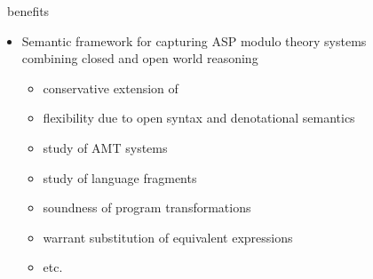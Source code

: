 \begin{frame}{\HTC\ benefits}
  \bigskip
  \begin{itemize}
  \item Semantic framework for capturing ASP modulo theory systems
    \\
    combining closed and open world reasoning
    \par\smallskip
    \begin{itemize}\normalsize
    \item conservative extension of \HT\
    \item flexibility due to open syntax and denotational semantics
    \item study of AMT systems
    \item study of language fragments
    \item soundness of program transformations
    \item warrant substitution of equivalent expressions
    \item etc.
    \end{itemize}
  \end{itemize}
\end{frame}
%
